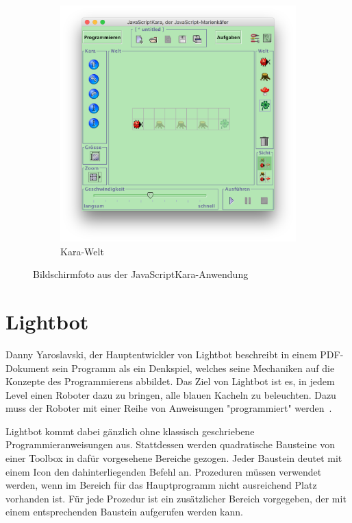 \begin{figure}
\begin{subfigure}[b]{0.5\textwidth}
        \includegraphics[width=\textwidth]{gfx/related-kara-world.png}
        \caption{Kara-Welt}
        \label{fig:related:kara:world}
    \end{subfigure}
    \caption{Bildschirmfoto aus der JavaScriptKara-Anwendung}
    \label{fig:related:kara}
\end{figure}

\section{Lightbot}
\label{sec:related:lightbot}

Danny Yaroslavski, der Hauptentwickler von Lightbot beschreibt in einem PDF-Dokument sein Programm als ein Denkspiel, welches seine Mechaniken auf die Konzepte des Programmierens abbildet. Das Ziel von Lightbot ist es, in jedem Level einen Roboter dazu zu bringen, alle blauen Kacheln zu beleuchten. Dazu muss der Roboter mit einer Reihe von Anweisungen "programmiert" werden~\cite{yaroslavski2014}.

Lightbot kommt dabei gänzlich ohne klassisch geschriebene Programmieranweisungen aus. Stattdessen werden quadratische Bausteine von einer Toolbox in dafür vorgesehene Bereiche gezogen. Jeder Baustein deutet mit einem Icon den dahinterliegenden Befehl an. Prozeduren müssen verwendet werden, wenn im Bereich für das Hauptprogramm nicht ausreichend Platz vorhanden ist. Für jede Prozedur ist ein zusätzlicher Bereich vorgegeben, der mit einem entsprechenden Baustein aufgerufen werden kann.

